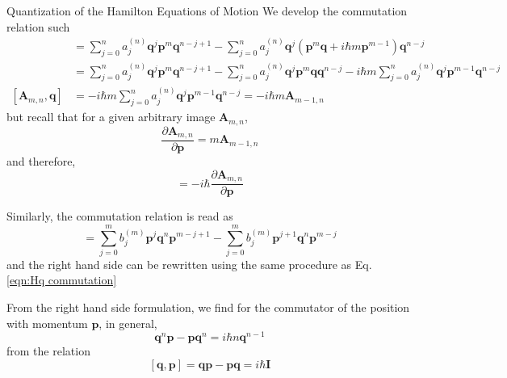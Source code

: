 \documentclass[aspectratio=169]{beamer}
\begin{document}
\begin{frame}[allowframebreaks]{Quantization of the Hamilton Equations of Motion}
		We develop the commutation relation such
		\begin{align}
			[\textbf{A}_{m,n},\textbf{q}]&=\sum_{j=0}^na_j^{(n)}\textbf{q}^{j}\textbf{p}^m\textbf{q}^{n-j+1}-\sum_{j=0}^na_j^{(n)}\textbf{q}^{j}(\textbf{p}^{m}\textbf{q}+i\hbar m\textbf{p}^{m-1})\textbf{q}^{n-j} \\
			&=\sum_{j=0}^na_j^{(n)}\textbf{q}^{j}\textbf{p}^m\textbf{q}^{n-j+1}-\sum_{j=0}^na_j^{(n)}\textbf{q}^{j}\textbf{p}^{m}\textbf{q}\textbf{q}^{n-j}-i\hbar m\sum_{j=0}^na_j^{(n)}\textbf{q}^{j}\textbf{p}^{m-1}\textbf{q}^{n-j}  \\
			[\textbf{A}_{m,n},\textbf{q}]&=-i\hbar m\sum_{j=0}^na_j^{(n)}\textbf{q}^{j}\textbf{p}^{m-1}\textbf{q}^{n-j}=-i\hbar m\textbf{A}_{m-1,n}
		\end{align}
		but recall that for a given arbitrary image $\textbf{A}_{m,n}$,
		\begin{equation}
			\frac{\partial\textbf{A}_{m,n}}{\partial\textbf{p}}=m\textbf{A}_{m-1,n}
		\end{equation}
		and therefore,
		\begin{equation}
			[\textbf{A}_{m,n},\textbf{q}]=-i\hbar \frac{\partial\textbf{A}_{m,n}}{\partial\textbf{p}}
		\end{equation}
		
		Similarly, the commutation relation is read as
		\begin{equation}
			[\textbf{A}_{m,n},\textbf{p}]=\sum_{j=0}^mb_j^{(m)}\textbf{p}^j\textbf{q}^n\textbf{p}^{m-j+1}-\sum_{j=0}^mb_j^{(m)}\textbf{p}^{j+1}\textbf{q}^{n}\textbf{p}^{m-j}
		\end{equation}
		and the right hand side can be rewritten using the same procedure as Eq. \ref{eqn:Hq commutation}
		
		From the right hand side formulation, we find for the commutator of the position with momentum $\textbf{p}$, in general, 
		\begin{equation}
			\textbf{q}^n\textbf{p}-\textbf{p}\textbf{q}^n=i\hbar n\textbf{q}^{n-1}
		\end{equation}
		from the relation
		\begin{equation}\label{eqn:Hq commutation2}
			[\textbf{q},\textbf{p}]=\textbf{q}\textbf{p}-\textbf{p}\textbf{q}=i\hbar\textbf{I}
		\end{equation}
		

\end{frame}
\end{document}
